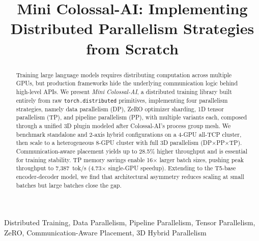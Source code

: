 \documentclass[conference]{IEEEtran}
\begin{document}
\title{Mini Colossal-AI: Implementing Distributed Parallelism Strategies from Scratch\\}

\author{
\and
{}
\and
{}
\and
{}
}

\maketitle

\begin{abstract}
Training large language models requires distributing computation across multiple GPUs, but production frameworks hide the underlying communication logic behind high-level APIs. We present \textit{Mini Colossal-AI}, a distributed training library built entirely from raw \texttt{torch.distributed} primitives, implementing four parallelism strategies, namely data parallelism (DP), ZeRO optimizer sharding, 1D tensor parallelism (TP), and pipeline parallelism (PP), with multiple variants each, composed through a unified 3D plugin modeled after Colossal-AI's process group mesh. We benchmark standalone and 2-axis hybrid configurations on a 4-GPU all-TCP cluster, then scale to a heterogeneous 8-GPU cluster with full 3D parallelism (DP$\times$PP$\times$TP). Communication-aware placement yields up to 28.5\% higher throughput and is essential for training stability. TP memory savings enable 16$\times$ larger batch sizes, pushing peak throughput to 7,387~tok/s (4.73$\times$ single-GPU speedup). Extending to the T5-base encoder-decoder model, we find that architectural asymmetry reduces scaling at small batches but large batches close the gap.
\end{abstract}

\begin{IEEEkeywords}
Distributed Training, Data Parallelism, Pipeline Parallelism, Tensor Parallelism, ZeRO, Communication-Aware Placement, 3D Hybrid Parallelism
\end{IEEEkeywords}
\end{document}
